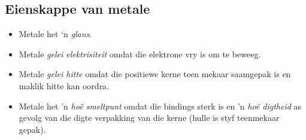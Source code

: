 \subsection*{Eienskappe van metale}
\begin{itemize}
 \item Metale het ‘n \textsl{glans}.
\item Metale \textsl{gelei elektrisiteit} omdat die elektrone vry is om te beweeg.
\item Metale \textsl{gelei hitte} omdat die positiewe kerne teen mekaar saamgepak is en maklik hitte kan oordra.
\item Metale het 'n \textsl{ho\"{e} smeltpunt} omdat die bindings sterk is en 'n \textsl{ho\"{e} digtheid} as gevolg van die digte verpakking van die kerne (hulle is styf teenmekaar gepak).
\end{itemize}

